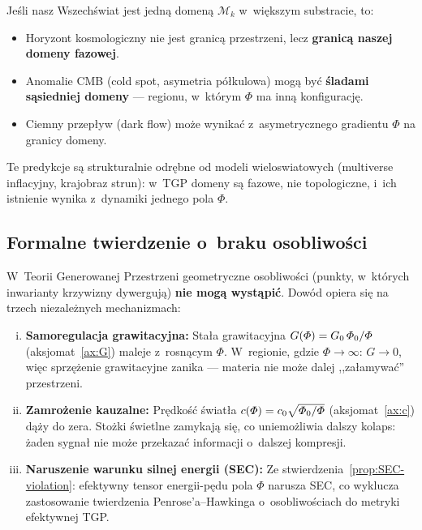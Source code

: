 \begin{remark}
Je\'sli nasz Wszech\'swiat jest jedn\k{a} domen\k{a} $\mathcal{M}_k$
w~wi\k{e}kszym substracie, to:
\begin{itemize}[nosep]
  \item Horyzont kosmologiczny nie jest granic\k{a} przestrzeni,
        lecz \textbf{granic\k{a} naszej domeny fazowej}.
  \item Anomalie CMB (cold spot, asymetria p\'o\l{}kulowa)
        mog\k{a} by\'c \textbf{\'sladami s\k{a}siedniej domeny} ---
        regionu, w~kt\'orym $\Phi$ ma inn\k{a} konfiguracj\k{e}.
  \item Ciemny przep\l{}yw (dark flow) mo\.ze wynika\'c
        z~asymetrycznego gradientu $\Phi$ na granicy domeny.
\end{itemize}
Te predykcje s\k{a} strukturalnie odr\k{e}bne od modeli
wieloswiatowych (multiverse inflacyjny, krajobraz strun):
w~TGP domeny s\k{a} fazowe, nie topologiczne, i~ich istnienie
wynika z~dynamiki jednego pola $\Phi$.
\end{remark}

\subsection{Formalne twierdzenie o~braku osobliwo\'sci}\label{ssec:no-singularity}

\begin{theorem}\label{thm:no-singularity}
W~Teorii Generowanej Przestrzeni geometryczne osobliwo\'sci
(punkty, w~kt\'orych inwarianty krzywizny dywerguj\k{a})
\textbf{nie mog\k{a} wyst\k{a}pi\'c}. Dow\'od opiera si\k{e}
na trzech niezale\.znych mechanizmach:

\begin{enumerate}[(i)]
  \item \textbf{Samoregulacja grawitacyjna:}
    Sta\l{}a grawitacyjna $G(\varPhi) = G_0\,\varPhi_0/\varPhi$
    (aksjomat~\ref{ax:G}) maleje z~rosn\k{a}cym $\Phi$.
    W~regionie, gdzie $\Phi \to \infty$:
    $G \to 0$, wi\k{e}c sprz\k{e}\.zenie grawitacyjne zanika
    --- materia nie mo\.ze dalej ,,za\l{}amywa\'c'' przestrzeni.

  \item \textbf{Zamro\.zenie kauzalne:}
    Pr\k{e}dko\'s\'c \'swiat\l{}a $c(\varPhi) = c_0\sqrt{\varPhi_0/\varPhi}$
    (aksjomat~\ref{ax:c}) d\k{a}\.zy do zera.
    Sto\.zki \'swietlne zamykaj\k{a} si\k{e}, co uniemo\.zliwia
    dalszy kolaps: \.zaden sygna\l{} nie mo\.ze przekaza\'c
    informacji o~dalszej kompresji.

  \item \textbf{Naruszenie warunku silnej energii (SEC):}
    Ze stwierdzenia~\ref{prop:SEC-violation}:
    efektywny tensor energii-p\k{e}du pola $\Phi$ narusza SEC,
    co wyklucza zastosowanie twierdzenia Penrose'a--Hawkinga
    o~osobliwo\'sciach do metryki efektywnej TGP.
\end{enumerate}
\end{theorem}

